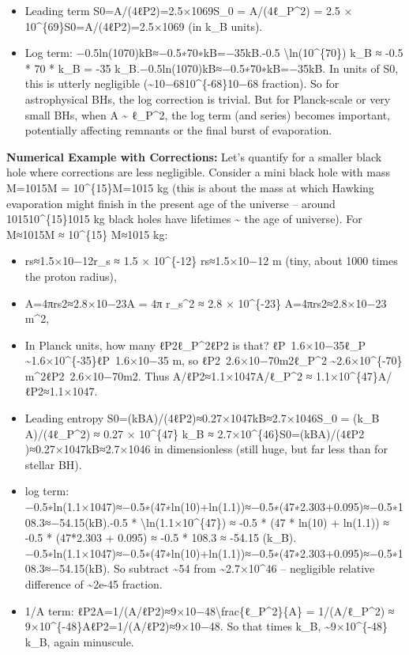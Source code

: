 \documentclass[]{article}
\begin{document}
\begin{itemize}
\item
  Leading term S0=A/(4ℓP2)=2.5×1069S\_0 = A/(4ℓ\_P\^{}2) = 2.5 ×
  10\^{}\{69\}S0​=A/(4ℓP2​)=2.5×1069 (in k\_B units).
\item
  Log term: −0.5ln⁡(1070)kB≈−0.5∗70∗kB=−35kB.-0.5
  \textbackslash{}ln(10\^{}\{70\}) k\_B ≈ -0.5 * 70 * k\_B = -35
  k\_B.−0.5ln(1070)kB​≈−0.5∗70∗kB​=−35kB​. In units of S0, this is
  utterly negligible (\textasciitilde{}10−6810\^{}\{-68\}10−68
  fraction). So for astrophysical BHs, the log correction is trivial.
  But for Planck-scale or very small BHs, when A \textasciitilde{}
  ℓ\_P\^{}2, the log term (and series) becomes important, potentially
  affecting remnants or the final burst of evaporation.
\end{itemize}

\textbf{Numerical Example with Corrections:} Let's quantify for a
smaller black hole where corrections are less negligible. Consider a
mini black hole with mass M=1015M = 10\^{}\{15\}M=1015 kg (this is about
the mass at which Hawking evaporation might finish in the present age of
the universe -- around 101510\^{}\{15\}1015 kg black holes have
lifetimes \textasciitilde{} the age of universe). For M≈1015M ≈
10\^{}\{15\} M≈1015 kg:

\begin{itemize}
\item
  rs≈1.5×10−12r\_s ≈ 1.5 × 10\^{}\{-12\} rs​≈1.5×10−12 m (tiny, about
  1000 times the proton radius),
\item
  A=4πrs2≈2.8×10−23A = 4π r\_s\^{}2 ≈ 2.8 × 10\^{}\{-23\}
  A=4πrs2​≈2.8×10−23 m\^{}2,
\item
  In Planck units, how many ℓP2ℓ\_P\^{}2ℓP2​ is that? ℓP~1.6×10−35ℓ\_P
  \textasciitilde{}1.6×10\^{}\{-35\}ℓP​~1.6×10−35 m, so
  ℓP2~2.6×10−70m2ℓ\_P\^{}2 \textasciitilde{}2.6×10\^{}\{-70\}
  m\^{}2ℓP2​~2.6×10−70m2. Thus A/ℓP2≈1.1×1047A/ℓ\_P\^{}2 ≈
  1.1×10\^{}\{47\}A/ℓP2​≈1.1×1047.
\item
  Leading entropy S0=(kBA)/(4ℓP2)≈0.27×1047kB≈2.7×1046S\_0 = (k\_B
  A)/(4ℓ\_P\^{}2) ≈ 0.27 × 10\^{}\{47\} k\_B ≈
  2.7×10\^{}\{46\}S0​=(kB​A)/(4ℓP2​)≈0.27×1047kB​≈2.7×1046 in
  dimensionless (still huge, but far less than for stellar BH).
\item
  log term:
  −0.5∗ln⁡(1.1×1047)≈−0.5∗(47∗ln(10)+ln(1.1))≈−0.5∗(47∗2.303+0.095)≈−0.5∗108.3≈−54.15(kB).-0.5
  * \textbackslash{}ln(1.1×10\^{}\{47\}) ≈ -0.5 * (47 * ln(10) +
  ln(1.1)) ≈ -0.5 * (47*2.303 + 0.095) ≈ -0.5 * 108.3 ≈ -54.15
  (k\_B).−0.5∗ln(1.1×1047)≈−0.5∗(47∗ln(10)+ln(1.1))≈−0.5∗(47∗2.303+0.095)≈−0.5∗108.3≈−54.15(kB​).
  So subtract \textasciitilde{}54 from \textasciitilde{}2.7×10\^{}46 --
  negligible relative difference of \textasciitilde{}2e-45 fraction.
\item
  1/A term: ℓP2A=1/(A/ℓP2)≈9×10−48\textbackslash{}frac\{ℓ\_P\^{}2\}\{A\}
  = 1/(A/ℓ\_P\^{}2) ≈ 9×10\^{}\{-48\}AℓP2​​=1/(A/ℓP2​)≈9×10−48. So that
  times k\_B, \textasciitilde{}9×10\^{}\{-48\} k\_B, again minuscule.
\end{itemize}
\end{document}
